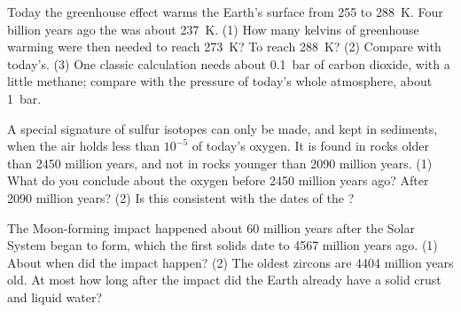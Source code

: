 \begin{exercise}[$\star\star\star$]\label{exo:g12:early-earth:13}
Today the greenhouse effect warms the Earth's surface from 255 to
\qty{288}{K}. Four billion years ago the  was about
\qty{237}{K}. (1) How many kelvins of greenhouse warming were then needed
to reach \qty{273}{K}? To reach \qty{288}{K}? (2) Compare with today's.
(3) One classic calculation needs about \qty{0.1}{bar} of carbon dioxide,
with a little methane; compare with the pressure of today's whole
atmosphere, about \qty{1}{bar}.
\end{exercise}

\begin{exercise}[$\star\star\star$]\label{exo:g12:early-earth:14}
A special signature of sulfur isotopes can only be made, and kept in
sediments, when the air holds less than $10^{-5}$ of today's oxygen. It is
found in rocks older than 2450 million years, and not in rocks younger than
2090 million years. (1) What do you conclude about the oxygen before 2450
million years ago? After 2090 million years? (2) Is this consistent with the
dates of the ?
\end{exercise}

\begin{exercise}[$\star\star\star$]\label{exo:g12:early-earth:15}
The Moon-forming impact happened about 60 million years after the Solar
System began to form, which the first solids date to 4567 million years ago.
(1) About when did the impact happen? (2) The oldest zircons are \num{4404}
million years old. At most how long after the impact did the Earth already
have a solid crust and liquid water?
\end{exercise}

